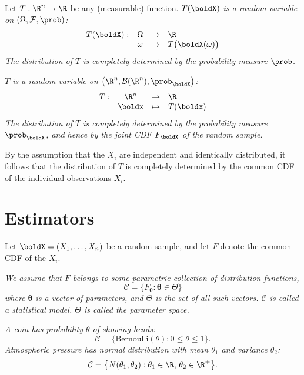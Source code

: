 \begin{remark}
Let $T:\R^n\to\R$ be any (measurable) function.
\bit
\it 
$T(\boldX)$ is a random variable on $(\Omega,\mathcal{F},\prob)$:
\[\begin{array}{rccl}
T(\boldX):	& \Omega 	& \to 		& \R \\
			& \omega	& \mapsto	& T\big(\boldX(\omega)\big)
\end{array}\]
The distribution of $T$ is completely determined by the probability measure $\prob$.

\it 
$T$ is a random variable on $\big(\R^n,\mathcal{B}(\R^n),\prob_{\boldX}\big)$:
\[\begin{array}{rccl}
T:	& \R^n 		& \to 		& \R \\
	& \boldx	& \mapsto	& T(\boldx)
\end{array}\]
The distribution of $T$ is completely determined by the probability measure $\prob_{\boldX}$, and hence by the joint CDF $F_{\boldX}$ of the random sample.
\par
By the assumption that the $X_i$ are independent and identically distributed, it follows that the distribution of $T$ is completely determined by the common CDF of the individual observations $X_i$. 
\eit
\end{remark}


\section{Estimators}
Let $\boldX = (X_1,\ldots,X_n)$ be a random sample, and let $F$ denote the common CDF of the $X_i$.

\vspace{2ex}
\bit
\it
We assume that $F$ belongs to some parametric collection of distribution functions, 
\[
\mathcal{C} = \{F_{\mathbf{\theta}} : \mathbf{\theta}\in\Theta\}
\]
where $\mathbf{\theta}$ is a vector of parameters, and $\Theta$ is the set of all such vectors.
\it $\mathcal{C}$ is called a \emph{statistical model}.
\it $\Theta$ is called the \emph{parameter space}.
\eit

\begin{example}
\bit
\it A coin has probability $\theta$ of showing heads:
\[
\mathcal{C} = \big\{\text{Bernoulli}(\theta):0\leq\theta\leq 1\big\}.
\]
\it Atmospheric pressure has normal distribution with mean $\theta_1$ and variance $\theta_2$:
\[
\mathcal{C} = \big\{N(\theta_1,\theta_2) : \theta_1\in\R,\,\theta_2\in\R^{+}\big\}.
\]

\eit
\end{example}



